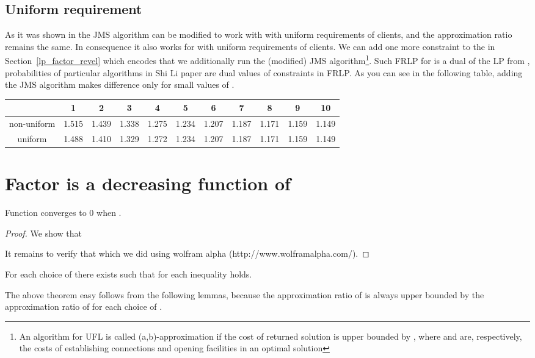 \documentclass{llncs}
\begin{document}
\subsection{Uniform requirement}
As it was shown in \cite{Swamy} the JMS algorithm can be modified to work with  with uniform requirements of clients, and the approximation ratio remains the same. In consequence it also works for  with uniform requirements of clients. We can add one more constraint  to the  in Section~\ref{lp_factor_revel} which encodes that we additionally run the (modified) JMS algorithm\footnote{An algorithm for UFL is called (a,b)-approximation if the cost of returned solution is upper bounded by , where  and  are, respectively, the costs of establishing connections and opening facilities in an optimal solution}. Such FRLP for  is a dual of the LP from \cite{ShiLi}, probabilities of particular algorithms in Shi Li paper are dual values of constraints in FRLP. As you can see in the following table, adding the JMS algorithm makes difference only for small values of .

\begin{center}
  \begin{tabular}{ c | c | c | c | c | c | c | c | c | c | c }
     & 1 & 2 & 3 & 4 & 5 & 6 & 7 & 8 & 9 & 10 \\ \hline
    non-uniform & 1.515 & 1.439 & 1.338 & 1.275 & 1.234 & 1.207 & 1.187 & 1.171 & 1.159 & 1.149 \\ \hline
    uniform & 1.488 & 1.410 & 1.329 & 1.272 & 1.234 & 1.207 & 1.187 & 1.171 & 1.159 & 1.149 \\
  \end{tabular}
\end{center}

\section{Factor  is a decreasing function of }
\label{r_vs_apx}

\begin{lemma}
\label{technical_lemma}
 Function  converges to 0 when .
\end{lemma}

\begin{proof}
We show that 



It remains to verify that  
which we did using wolfram alpha (http://www.wolframalpha.com/).
\end{proof}

\begin{theorem}
\label{apx_r_relation}
 For each choice of  there exists  such that for each  inequality  holds.
\end{theorem}
The above theorem easy follows from the following lemmas, because the approximation ratio of  is always upper bounded by the approximation ratio of  for each choice of .
\end{document}
